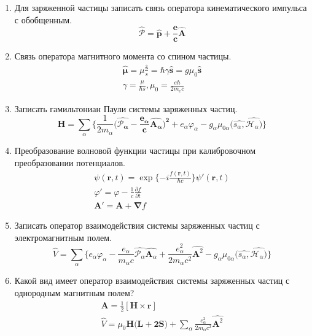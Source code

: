 \documentclass{article}
\begin{document}
\begin{enumerate}
	\item {Для заряженной частицы записать связь оператора кинематического импульса с обобщенным.}
	\begin{equation}
		\boldsymbol{\hat{\mathcal{P}}=\hat{p}+\frac{e}{c}\hat{A}}
	\end{equation}
	
	\item {Связь оператора магнитного момента со спином частицы.}
	\begin{gather}
		\hat{\boldsymbol{\mu}}=\mu\frac{\hat{\boldsymbol{s}}}{s}=\hbar\gamma\hat{\boldsymbol{s}}=g\mu_{0}\boldsymbol{\hat{s}}\\
		\gamma=\frac{\mu}{\hbar s},\mu_{0}=\frac{e\hbar}{2m_{e}c}
	\end{gather}
	
	\item {Записать гамильтониан Паули системы заряженных частиц.}
	\begin{equation}
		\hat{\boldsymbol{H}}=\sum_{\alpha}\big\{\frac{1}{2m_{\alpha}}\big(\boldsymbol{\hat{\mathcal{P}_{\alpha}}-\frac{e_{\alpha}}{c}\hat{A_{\alpha}}\big)^{2}}+e_{\alpha}\varphi_{\alpha}-g_{\alpha}\mu_{0\alpha}(\hat{s_{\alpha},}\hat{\mathcal{H}_{\alpha})}\big\}
	\end{equation}
	
	\item {Преобразование волновой функции частицы при калибровочном преобразовании потенциалов.}
	\begin{gather}
		\psi(\boldsymbol{r},t)=\exp\{-i\frac{f(\boldsymbol{r},t)}{\hbar c}\}\psi'(\boldsymbol{r},t)\\
		\varphi'=\varphi-\frac{1}{c}\frac{\partial f}{\partial t}\\
		\boldsymbol{A'=A+\nabla}f
	\end{gather}
	
	\item {Записать оператор взаимодействия системы заряженных частиц с электромагнитным полем.}
	\begin{equation}
		\hat{V}=\sum_{\alpha}\big\{ e_{\alpha}\varphi_{\alpha}-\frac{e_{\alpha}}{m_{\alpha}c}\hat{\mathcal{\mathcal{P}_{\alpha}}}\hat{\boldsymbol{A}_{\alpha}}+\frac{e_{\alpha}^{2}}{2m_{\alpha}c^{2}}\hat{\boldsymbol{A}^{2}}-g_{\alpha}\mu_{0\alpha}(\hat{s_{\alpha},}\hat{\mathcal{H}_{\alpha})}\big\}
	\end{equation}
	
	\item {Какой вид имеет оператор взаимодействия системы заряженных частиц с однородным магнитным полем?}
	\begin{gather}
		\boldsymbol{A}=\frac{1}{2}[\mathcal{\boldsymbol{H}} \times \boldsymbol{r}]\\
		\hat{V}=\mu_{0}\mathcal{\boldsymbol{H}}(\boldsymbol{L+2S)}+\sum_{\alpha}\frac{e_{\alpha}^{2}}{2m_{\alpha}c^{2}}\hat{\boldsymbol{A}^{2}}
	\end{gather}
	

\end{enumerate}
\end{document}
